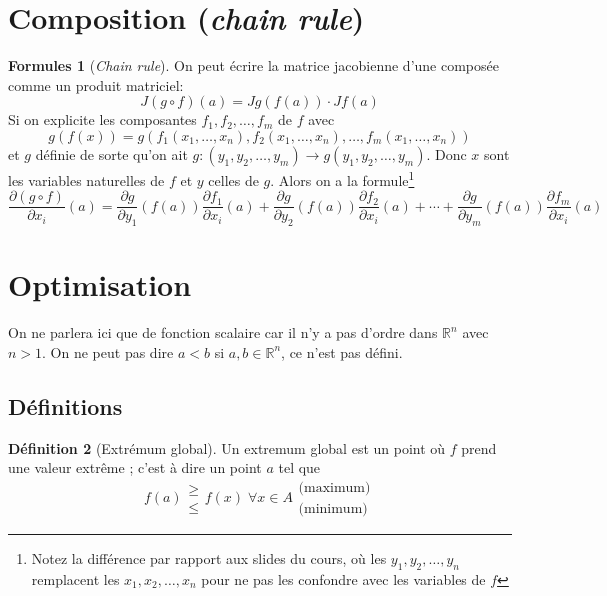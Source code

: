 \documentclass[11pt,a4paper]{article}
\theoremstyle{definition}
\newtheorem{mydef}{Définition}%
\newtheorem{myform}[mydef]{Formules}
\newcommand{\pa}{\partial}
\newcommand{\R}{\mathbb{R}}
\newcommand{\Rn}{\R^n}
\begin{document}

\section{Composition (\emph{chain rule})}

\begin{myform}[\emph{Chain rule}]
	On peut écrire la matrice jacobienne d'une composée comme un produit matriciel:
	\[ J(g \circ f)(a) = Jg(f(a)) \cdot Jf(a) \]
	Si on explicite les composantes $f_1, f_2, \dots , f_m$ de $f$ avec
	\[ g(f(x)) = g( f_1(x_1, \dots, x_n), f_2(x_1, \dots, x_n), \dots, f_m(x_1, \dots, x_n)) \]
	et $g$ définie de sorte qu'on ait $g : (y_1, y_2, \dots , y_m) \rightarrow g(y_1, y_2, \dots, y_m)$. Donc $x$ sont les variables naturelles de $f$ et $y$ celles de $g$.
	Alors on a la formule\footnote{Notez la différence par rapport aux slides du cours, où les $y_1, y_2, \dots, y_n$ remplacent les $x_1, x_2, \dots, x_n$ pour ne pas les confondre avec les variables de $f$}
	\[ \frac{\pa (g \circ f)}{\pa x_i}(a) = \frac{ \pa g}{\pa y_1}(f(a)) \frac{\pa f_1}{\pa x_i}(a) + \frac{ \pa g}{\pa y_2}(f(a)) \frac{\pa f_2}{\pa x_i}(a) + \cdots + \frac{ \pa g}{\pa y_m}(f(a)) \frac{\pa f_m}{\pa x_i}(a) \]
\end{myform}


\section{Optimisation}

On ne parlera ici que de fonction scalaire car il n'y a pas d'ordre dans $\Rn$ avec $n > 1$.
On ne peut pas dire $a < b$ si $a, b \in \Rn$, ce n'est pas défini.

\subsection{Définitions}

\begin{mydef}[Extrémum global] Un extremum global est un point où $f$ prend une valeur extrême ; c'est à dire un point $a$ tel que
	\[ f(a) \begin{array}{l} \geq \\ \leq \end{array} f(x) \; \forall x \in A \begin{array}{l} \text{(maximum)} \\ \text{(minimum)}
	\end{array} \]
\end{mydef}
\end{document}
